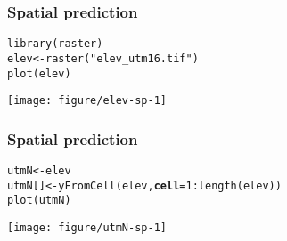 \documentclass[color=usenames,dvipsnames]{beamer}\usepackage[]{graphicx}\usepackage[]{color}
\makeatletter
\newcommand{\hlnum}[1]{\textcolor[rgb]{0.69,0.494,0}{#1}}%
\newcommand{\hlstr}[1]{\textcolor[rgb]{0.749,0.012,0.012}{#1}}%
\newcommand{\hlopt}[1]{\textcolor[rgb]{0,0,0}{#1}}%
\newcommand{\hlstd}[1]{\textcolor[rgb]{0,0,0}{#1}}%
\newcommand{\hlkwb}[1]{\textcolor[rgb]{0,0.341,0.682}{#1}}%
\newcommand{\hlkwc}[1]{\textcolor[rgb]{0,0,0}{\textbf{#1}}}%
\newcommand{\hlkwd}[1]{\textcolor[rgb]{0.004,0.004,0.506}{#1}}%
\newenvironment{kframe}{%
 \def\at@end@of@kframe{}%
 \ifinner\ifhmode%
  \def\at@end@of@kframe{\end{minipage}}%
  \begin{minipage}{\columnwidth}%
 \fi\fi%
 \def\FrameCommand##1{\hskip\@totalleftmargin \hskip-\fboxsep
 \colorbox{shadecolor}{##1}\hskip-\fboxsep
     \hskip-\linewidth \hskip-\@totalleftmargin \hskip\columnwidth}%
 \MakeFramed {\advance\hsize-\width
   \@totalleftmargin\z@ \linewidth\hsize
   \@setminipage}}%
 {\par\unskip\endMakeFramed%
 \at@end@of@kframe}
\newenvironment{knitrout}{}{} %
\makeatother
\begin{document}
\begin{frame}[fragile]
  \frametitle{Spatial prediction}
\begin{knitrout}\footnotesize
{}\color{fgcolor}\begin{kframe}
\begin{alltt}
\hlkwd{library}\hlstd{(raster)}
\hlstd{elev} \hlkwb{<-} \hlkwd{raster}\hlstd{(}\hlstr{"elev_utm16.tif"}\hlstd{)}
\hlkwd{plot}\hlstd{(elev)}
\end{alltt}
\end{kframe}

{\centering \texttt{[image: figure/elev-sp-1]} 

}



\end{knitrout}
\end{frame}




\begin{frame}[fragile]
  \frametitle{Spatial prediction}
\begin{knitrout}\footnotesize
{}\color{fgcolor}\begin{kframe}
\begin{alltt}
\hlstd{utmN} \hlkwb{<-} \hlstd{elev}
\hlstd{utmN[]} \hlkwb{<-} \hlkwd{yFromCell}\hlstd{(elev,} \hlkwc{cell}\hlstd{=}\hlnum{1}\hlopt{:}\hlkwd{length}\hlstd{(elev))}
\hlkwd{plot}\hlstd{(utmN)}
\end{alltt}
\end{kframe}

{\centering \texttt{[image: figure/utmN-sp-1]} 

}



\end{knitrout}
\end{frame}
\end{document}
